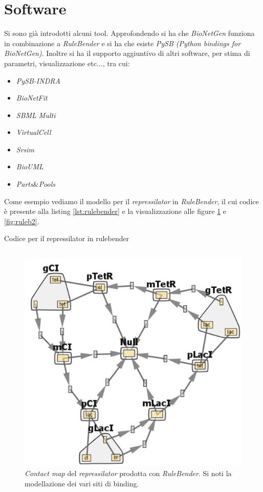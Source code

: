 \documentclass[a4paper,12pt, oneside]{book}
\begin{document}
\section{Software}
Si sono già introdotti alcuni tool. Approfondendo si ha che \textit{BioNetGen}
funziona in combinazione a \textit{RuleBender} e si ha che esiste \textit{PySB
  (Python bindings for BioNetGen)}. Inoltre si ha il supporto aggiuntivo di
altri software, per stima di parametri, visualizzazione etc$\ldots$, tra cui:
\begin{multicols}{2}
  \begin{itemize}
    \item \textit{PySB-INDRA}
    \item \textit{BioNetFit}
    \item \textit{SBML Multi}
    \item \textit{VirtualCell}
    \item \textit{Srsim}
    \item \textit{BioUML}
    \item \textit{Parts}\&\textit{Pools}
  \end{itemize}
\end{multicols}
Come esempio vediamo il modello per il \textit{repressilator} in
\textit{RuleBender}, il cui codice è presente alla listing \ref{lst:rulebender}
e la visualizzazione alle figure \ref{fig:ruleb1} e \ref{fig:ruleb2}.
\begin{listing}
  \tiny
  \caption{Codice per il repressilator in rulebender}
  \inputminted{octave}{code/repr.bngl}
  \label{lst:rulebender}
\end{listing}
\begin{figure}
  \centering
  \includegraphics[scale = 0.4]{img/ruleb1.jpg}
  \caption{\textit{Contact map} del \textit{repressilator} prodotta con
    \textit{RuleBender}. Si noti la modellazione dei vari siti di binding.}
  \label{fig:ruleb1}
\end{figure}
\end{document}
